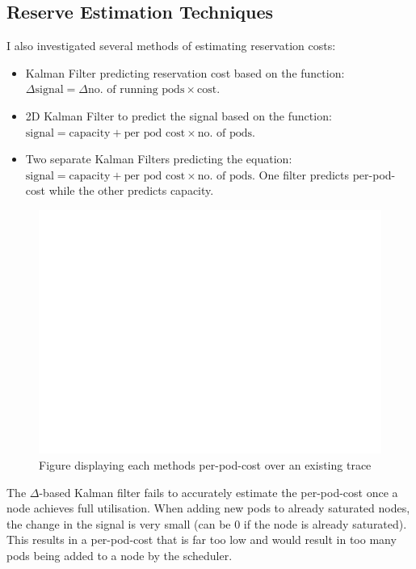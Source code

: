 \subsection{Reserve Estimation Techniques}
I also investigated several methods of estimating reservation costs:
\begin{itemize}
    \item Kalman Filter predicting reservation cost based on the function:
        $\Delta \text{signal} = \Delta \text{no. of running pods} \times
        \text{cost}$.
    \item 2D Kalman Filter to predict the signal based on the function:
        $\text{signal} = \text{capacity} + \text{per pod cost} \times \text{no.
        of pods}$.
    \item Two separate Kalman Filters predicting the equation: $\text{signal} =
        \text{capacity} + \text{per pod cost} \times \text{no. of pods}$. One
        filter predicts per-pod-cost while the other predicts capacity.
\end{itemize}

\begin{figure}[h]
    \centering
    \includegraphics[width=\textwidth]{images/blank.pdf}
    \caption{Figure displaying each methods per-pod-cost over an existing trace}
    \label{eval-filter}
\end{figure}

The $\Delta$-based Kalman filter fails to accurately estimate the per-pod-cost
once a node achieves full utilisation. When adding new pods to already saturated
nodes, the change in the signal is very small (can be 0 if the node is already
saturated). This results in a per-pod-cost that is far too low and would result
in too many pods being added to a node by the scheduler.

